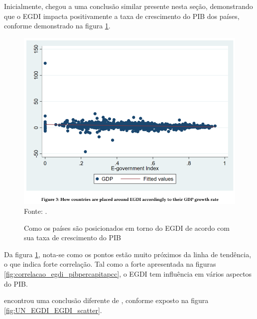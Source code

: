 Inicialmente, \cite{alisherovna2021whether} chegou a uma conclusão similar presente nesta seção, demonstrando que o EGDI impacta positivamente a taxa de crescimento do PIB dos países, conforme demonstrado na figura \ref{fig:usmanova_egdi_gdp}.

\begin{figure}[H]
	\centering
	\caption{Como os países são posicionados em torno do EGDI de acordo com sua taxa de crescimento do PIB}
	\includegraphics[width=1\linewidth]{figuras/usmanova_egdi_gdp}
	\label{fig:usmanova_egdi_gdp}
	\footnotesize{Fonte: \cite{alisherovna2021whether}.}
\end{figure}

Da figura \ref{fig:usmanova_egdi_gdp}, nota-se como os pontos estão muito próximos da linha de tendência, o que indica forte correlação. Tal como a forte apresentada na figuras \ref{fig:correlacao_egdi_pibpercapitapcc}, o EGDI tem influência em vários aspectos do PIB.

\cite{scatterplot_egdi_2024} encontrou uma conclusão diferente de \cite{alisherovna2021whether}, conforme exposto na figura \ref{fig:UN_EGDI_EGDI_scatter}.

